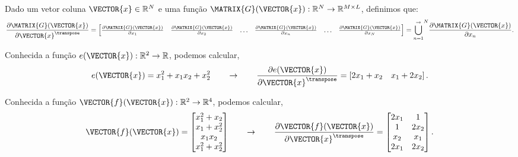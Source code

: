 \begin{definition}\label{def:deltahor3}
Dado 
um vetor coluna $\VECTOR{x}\in \mathbb{R}^N$ e 
uma função $\MATRIX{G}(\VECTOR{x}): \mathbb{R}^N \rightarrow \mathbb{R}^{M\times L}$, 
definimos que:
\begin{equation}
\frac{\partial \MATRIX{G}(\VECTOR{x}) }{\partial \VECTOR{x}^{\transpose}}= 
\left[
\begin{matrix}
\frac{\partial \MATRIX{G}(\VECTOR{x}) }{\partial x_{1}}&
\frac{\partial \MATRIX{G}(\VECTOR{x}) }{\partial x_{2}}&
\hdots&
\frac{\partial \MATRIX{G}(\VECTOR{x}) }{\partial x_{n}}&
\hdots&
\frac{\partial \MATRIX{G}(\VECTOR{x}) }{\partial x_{N}}
\end{matrix}
\right]= {\bigcup\limits_{n=1}^{\rightarrow}}^{N}{\frac{\partial \MATRIX{G}(\VECTOR{x}) }{\partial x_{n}}}.
\end{equation}
\end{definition}

\begin{example}
Conhecida a função $e(\VECTOR{x}): \mathbb{R}^2 \rightarrow \mathbb{R}$, podemos calcular,
\vspace{-1em}
\begin{equation}
e(\VECTOR{x})=x_1^2+x_1 x_2+x_2^2
\qquad \rightarrow \qquad
\frac{\partial e(\VECTOR{x}) }{\partial \VECTOR{x}^{\transpose}}=
\left[ 2 x_1+x_2 \quad x_1 + 2 x_2\right].
\end{equation}
\end{example}


\begin{example}
Conhecida a função $\VECTOR{f}(\VECTOR{x}): \mathbb{R}^2 \rightarrow \mathbb{R}^4$, podemos calcular,
\begin{equation}
\VECTOR{f}(\VECTOR{x})=
\begin{bmatrix}
x_1^2+x_2\\
x_1+x_2^2\\
x_1 x_2 \\
x_1^2+x_2^2
\end{bmatrix}
\qquad \rightarrow \qquad
\frac{\partial \VECTOR{f}(\VECTOR{x}) }{\partial \VECTOR{x}^{\transpose}}= 
\begin{bmatrix}
2 x_1 & 1\\
1     & 2 x_2\\
x_2   & x_1\\
2 x_1 & 2 x_2
\end{bmatrix}.
\end{equation}
\end{example}

